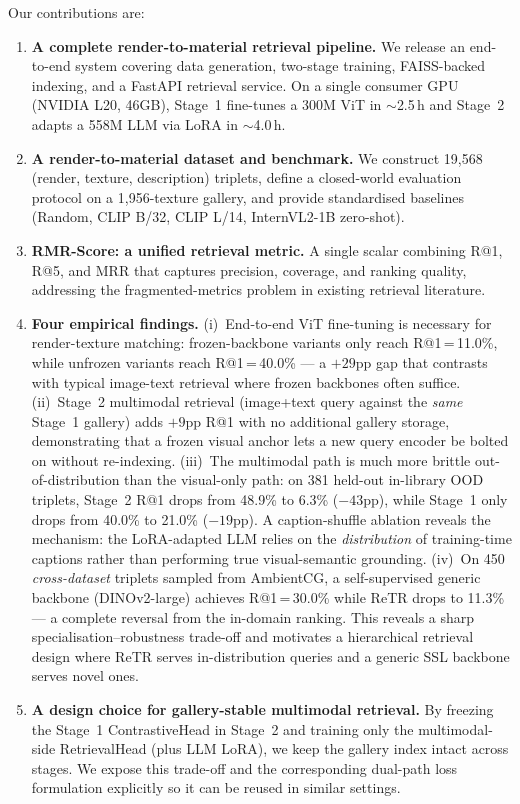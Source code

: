 \documentclass[10pt,twocolumn]{article}
\begin{document}
Our contributions are:
\begin{enumerate}[leftmargin=*,itemsep=0pt]
  \item \textbf{A complete render-to-material retrieval pipeline.}
        We release an end-to-end system covering data generation, two-stage
        training, FAISS-backed indexing, and a FastAPI retrieval service.
        On a single consumer GPU (NVIDIA L20, 46GB), Stage~1 fine-tunes a
        300M ViT in $\sim$2.5\,h and Stage~2 adapts a 558M LLM via LoRA in
        $\sim$4.0\,h.
  \item \textbf{A render-to-material dataset and benchmark.}
        We construct 19,568 (render, texture, description) triplets,
        define a closed-world evaluation protocol on a 1,956-texture gallery,
        and provide standardised baselines (Random, CLIP B/32, CLIP L/14,
        InternVL2-1B zero-shot).
  \item \textbf{RMR-Score: a unified retrieval metric.}
        A single scalar combining R@1, R@5, and MRR that captures precision,
        coverage, and ranking quality, addressing the fragmented-metrics
        problem in existing retrieval literature.
  \item \textbf{Four empirical findings.}
        (i)~End-to-end ViT fine-tuning is necessary for render-texture
        matching: frozen-backbone variants only reach R@1\,=\,11.0\%, while
        unfrozen variants reach R@1\,=\,40.0\% --- a $+29$pp gap that
        contrasts with typical image-text retrieval where frozen backbones
        often suffice.
        (ii)~Stage~2 multimodal retrieval (image+text query against the
        \emph{same} Stage~1 gallery) adds $+9$pp R@1 with no additional
        gallery storage, demonstrating that a frozen visual anchor lets a
        new query encoder be bolted on without re-indexing.
        (iii)~The multimodal path is much more brittle out-of-distribution
        than the visual-only path: on 381 held-out in-library OOD triplets,
        Stage~2 R@1 drops from 48.9\% to 6.3\% ($-43$pp), while Stage~1 only
        drops from 40.0\% to 21.0\% ($-19$pp). A caption-shuffle ablation
        reveals the mechanism: the LoRA-adapted LLM relies on the
        \emph{distribution} of training-time captions rather than performing
        true visual-semantic grounding.
        (iv)~On 450 \emph{cross-dataset} triplets sampled from AmbientCG, a
        self-supervised generic backbone (DINOv2-large) achieves R@1\,=\,30.0\%
        while ReTR drops to 11.3\% --- a complete reversal from the in-domain
        ranking. This reveals a sharp specialisation--robustness trade-off and
        motivates a hierarchical retrieval design where ReTR serves
        in-distribution queries and a generic SSL backbone serves novel ones.
  \item \textbf{A design choice for gallery-stable multimodal retrieval.}
        By freezing the Stage~1 ContrastiveHead in Stage~2 and training only
        the multimodal-side RetrievalHead (plus LLM LoRA), we keep the
        gallery index intact across stages.
        We expose this trade-off and the corresponding dual-path loss
        formulation explicitly so it can be reused in similar settings.
\end{enumerate}
\end{document}
